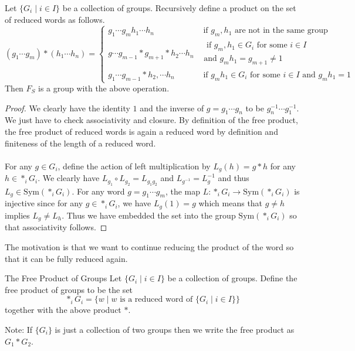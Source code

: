 \documentclass[a4paper]{article}
\begin{document}
\begin{prp}{}{} Let $\{G_i\;|\;i\in I\}$ be a collection of groups. Recursively define a product on the set of reduced words as follows. $$(g_1\cdots g_m)\ast(h_1\cdots h_n)=\begin{cases}
g_1\cdots g_mh_1\cdots h_n& \text{ if $g_m,h_1$ are not in the same group }\\
g\cdots g_{m-1}\ast g_{m+1}\ast h_2\cdots h_n & \substack{\text{ if }g_m,h_1\in G_i \text{ for some }i\in I\\\text{and }g_mh_1=g_{m+1}\neq 1}\\
g_1\cdots g_{m-1}\ast h_2,\cdots h_n & \text{ if $g_mh_1\in G_i$ for some $i\in I$ and $g_mh_1=1$}
\end{cases}$$
Then $F_S$ is a group with the above operation. \tcbline
\begin{proof}
We clearly have the identity $1$ and the inverse of $g=g_1\cdots g_n$ to be $g_n^{-1}\cdots g_1^{-1}$. We just have to check associativity and closure. By definition of the free product, the free product of reduced words is again a reduced word by definition and finiteness of the length of a reduced word. \\~\\
For any $g\in G_i$, define the action of left multiplication by $L_g(h)=g\ast h$ for any $h\in\ast_iG_i$. We clearly have $L_{g_1}\circ L_{g_2}=L_{g_1g_2}$ and $L_{g^{-1}}=L_g^{-1}$ and thus $L_g\in\text{Sym}(\ast_iG_i)$. For any word $g=g_1\cdots g_m$, the map $L:\ast_iG_i\to\text{Sym}(\ast_iG_i)$ is injective since for any $g\in\ast_iG_i$, we have $L_g(1)=g$ which means that $g\neq h$ implies $L_g\neq L_h$. Thus we have embedded the set into the group $\text{Sym}(\ast_iG_i)$ so that associativity follows. 
\end{proof}
\end{prp}

The motivation is that we want to continue reducing the product of the word so that it can be fully reduced again. 

\begin{defn}{The Free Product of Groups}{} Let $\{G_i\;|\;i\in I\}$ be a collection of groups. Define the free product of groups to be the set $$\ast_i G_i=\{w\;|\;w\text{ is a reduced word of }\{G_i\;|\;i\in I\}\}$$ together with the above product $\ast$. 
\end{defn}

Note: If $\{G_i\}$ is just a collection of two groups then we write the free product as $G_1\ast G_2$. \\
\end{document}
